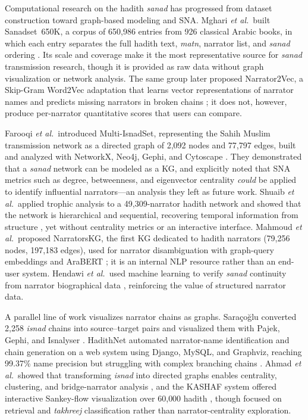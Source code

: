 \documentclass[conference]{IEEEtran}
\begin{document}
Computational research on the hadith \textit{sanad} has progressed from dataset
construction toward graph-based modeling and SNA. Mghari \textit{et al.}\ built
Sanadset~650K, a corpus of 650{,}986 entries from 926 classical Arabic books, in
which each entry separates the full hadith text, \textit{matn}, narrator list,
and \textit{sanad} ordering \cite{MGHARI2022108540}. Its scale and coverage make
it the most representative source for \textit{sanad} transmission research, though
it is provided as raw data without graph visualization or network analysis. The
same group later proposed Narrator2Vec, a Skip-Gram Word2Vec adaptation that
learns vector representations of narrator names and predicts missing narrators in
broken chains \cite{Mghari2024Narrator2Vec}; it does not, however, produce
per-narrator quantitative scores that users can compare.

Farooqi \textit{et al.}\ introduced Multi-IsnadSet, representing the Sahih Muslim
transmission network as a directed graph of 2{,}092 nodes and 77{,}797 edges,
built and analyzed with NetworkX, Neo4j, Gephi, and Cytoscape
\cite{FAROOQI2024110439}. They demonstrated that a \textit{sanad} network can be
modeled as a KG, and explicitly noted that SNA metrics such as degree,
betweenness, and eigenvector centrality \emph{could} be applied to identify
influential narrators---an analysis they left as future work. Shuaib \textit{et
al.}\ applied trophic analysis to a 49{,}309-narrator hadith network and showed
that the network is hierarchical and sequential, recovering temporal information
from structure \cite{Shuaib2022}, yet without centrality metrics or an interactive
interface. Mahmoud \textit{et al.}\ proposed NarratorsKG, the first KG dedicated
to hadith narrators (79{,}256 nodes, 197{,}183 edges), used for narrator
disambiguation with graph-query embeddings and AraBERT \cite{Mahmoud2024}; it is
an internal NLP resource rather than an end-user system. Hendawi \textit{et al.}\
used machine learning to verify \textit{sanad} continuity from narrator
biographical data \cite{10974901}, reinforcing the value of structured narrator
data.

A parallel line of work visualizes narrator chains as graphs. Sara\c{c}o\u{g}lu
converted 2{,}258 \textit{isnad} chains into source--target pairs and visualized
them with Pajek, Gephi, and Isnalyser \cite{saraccougluvisualization}. HadithNet
automated narrator-name identification and chain generation on a web system using
Django, MySQL, and Graphviz, reaching 99.37\% name precision but struggling with
complex branching chains \cite{alias2024hadithnet}. Ahmad \textit{et al.}\ showed
that transforming \textit{isnad} into directed graphs enables centrality,
clustering, and bridge-narrator analysis \cite{ahmad2025hadith}, and the KASHAF
system offered interactive Sankey-flow visualization over 60{,}000 hadith
\cite{shafie2021kashaf}, though focused on retrieval and \textit{takhreej}
classification rather than narrator-centrality exploration.
\end{document}
